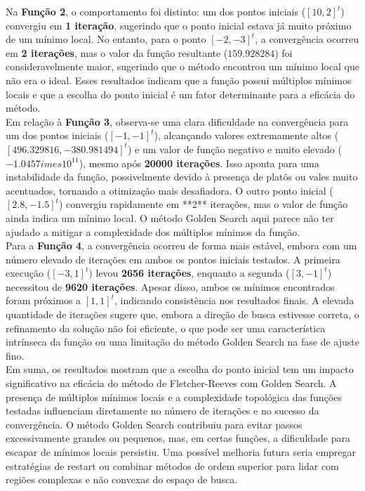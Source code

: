 \documentclass[a4paper, 12pt]{article}
\begin{document}
Na \textbf{Função 2}, o comportamento foi distinto: um dos pontos iniciais (\([10, 2]^t\)) convergiu em \textbf{1 iteração}, sugerindo que o ponto inicial estava já muito próximo de um mínimo local. No entanto, para o ponto \([-2, -3]^t\), a convergência ocorreu em \textbf{2 iterações}, mas o valor da função resultante (\(159.928284\)) foi consideravelmente maior, sugerindo que o método encontrou um mínimo local que não era o ideal. Esses resultados indicam que a função possui múltiplos mínimos locais e que a escolha do ponto inicial é um fator determinante para a eficácia do método.\\

Em relação à \textbf{Função 3}, observa-se uma clara dificuldade na convergência para um dos pontos iniciais (\([-1, -1]^t\)), alcançando valores extremamente altos (\([496.329816, -380.981494]^t\)) e um valor de função negativo e muito elevado (\(-1.0457 	imes 10^{11}\)), mesmo após \textbf{20000 iterações}. Isso aponta para uma instabilidade da função, possivelmente devido à presença de platôs ou vales muito acentuados, tornando a otimização mais desafiadora. O outro ponto inicial (\([2.8, -1.5]^t\)) convergiu rapidamente em **2** iterações, mas o valor de função ainda indica um mínimo local. O método Golden Search aqui parece não ter ajudado a mitigar a complexidade dos múltiplos mínimos da função.\\

Para a \textbf{Função 4}, a convergência ocorreu de forma mais estável, embora com um número elevado de iterações em ambos os pontos iniciais testados. A primeira execução (\([-3, 1]^t\)) levou \textbf{2656 iterações}, enquanto a segunda (\([3, -1]^t\)) necessitou de \textbf{9620 iterações}. Apesar disso, ambos os mínimos encontrados foram próximos a \([1, 1]^t\), indicando consistência nos resultados finais. A elevada quantidade de iterações sugere que, embora a direção de busca estivesse correta, o refinamento da solução não foi eficiente, o que pode ser uma característica intrínseca da função ou uma limitação do método Golden Search na fase de ajuste fino.\\

Em suma, os resultados mostram que a escolha do ponto inicial tem um impacto significativo na eficácia do método de Fletcher-Reeves com Golden Search. A presença de múltiplos mínimos locais e a complexidade topológica das funções testadas influenciam diretamente no número de iterações e no sucesso da convergência. O método Golden Search contribuiu para evitar passos excessivamente grandes ou pequenos, mas, em certas funções, a dificuldade para escapar de mínimos locais persistiu. Uma possível melhoria futura seria empregar estratégias de restart ou combinar métodos de ordem superior para lidar com regiões complexas e não convexas do espaço de busca.\\
\end{document}
